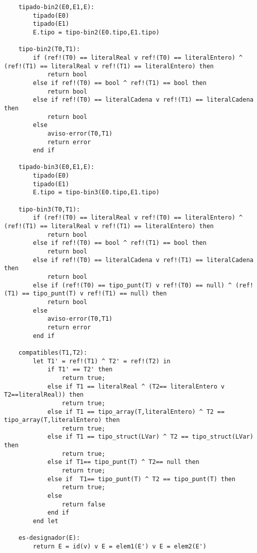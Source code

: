\begin{lstlisting}
    tipado-bin2(E0,E1,E):
        tipado(E0)
        tipado(E1)
        E.tipo = tipo-bin2(E0.tipo,E1.tipo)

    tipo-bin2(T0,T1):
        if (ref!(T0) == literalReal v ref!(T0) == literalEntero) ^ (ref!(T1) == literalReal v ref!(T1) == literalEntero) then
            return bool
        else if ref!(T0) == bool ^ ref!(T1) == bool then
            return bool
        else if ref!(T0) == literalCadena v ref!(T1) == literalCadena then 
            return bool
        else
            aviso-error(T0,T1)
            return error
        end if

    tipado-bin3(E0,E1,E):
        tipado(E0)
        tipado(E1)
        E.tipo = tipo-bin3(E0.tipo,E1.tipo)

    tipo-bin3(T0,T1):
        if (ref!(T0) == literalReal v ref!(T0) == literalEntero) ^ (ref!(T1) == literalReal v ref!(T1) == literalEntero) then
            return bool
        else if ref!(T0) == bool ^ ref!(T1) == bool then
            return bool
        else if ref!(T0) == literalCadena v ref!(T1) == literalCadena then 
            return bool
        else if (ref!(T0) == tipo_punt(T) v ref!(T0) == null) ^ (ref!(T1) == tipo_punt(T) v ref!(T1) == null) then
            return bool
        else
            aviso-error(T0,T1)
            return error
        end if

    compatibles(T1,T2):
        let T1' = ref!(T1) ^ T2' = ref!(T2) in
            if T1' == T2' then
                return true;
            else if T1 == literalReal ^ (T2== literalEntero v T2==literalReal)) then
            	return true;
            else if T1 == tipo_array(T,literalEntero) ^ T2 == tipo_array(T,literalEntero) then
            	return true;
            else if T1 == tipo_struct(LVar) ^ T2 == tipo_struct(LVar) then
            	return true;
            else if T1== tipo_punt(T) ^ T2== null then
            	return true;
            else if  T1== tipo_punt(T) ^ T2 == tipo_punt(T) then
            	return true;
            else
                return false
            end if
        end let

    es-designador(E):
        return E = id(v) v E = elem1(E') v E = elem2(E')

\end{lstlisting}
